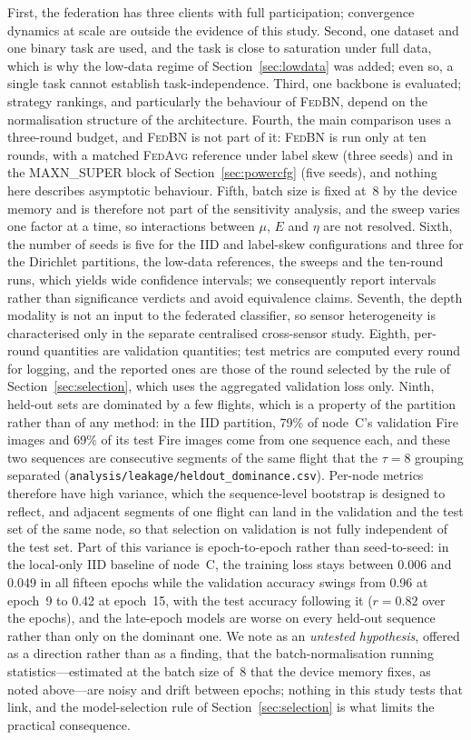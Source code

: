 \documentclass[journal]{IEEEtran}
\newcommand{\fedavg}{\textsc{FedAvg}}
\newcommand{\fedbn}{\textsc{FedBN}}
\begin{document}
First, the federation has three clients with full participation; convergence dynamics at scale are outside the evidence of this study. Second, one dataset and one binary task are used, and the task is close to saturation under full data, which is why the low-data regime of Section~\ref{sec:lowdata} was added; even so, a single task cannot establish task-independence. Third, one backbone is evaluated; strategy rankings, and particularly the behaviour of \fedbn{}, depend on the normalisation structure of the architecture. Fourth, the main comparison uses a three-round budget, and \fedbn{} is not part of it: \fedbn{} is run only at ten rounds, with a matched \fedavg{} reference under label skew (three seeds) and in the MAXN\_SUPER block of Section~\ref{sec:powercfg} (five seeds), and nothing here describes asymptotic behaviour. Fifth, batch size is fixed at~8 by the device memory and is therefore not part of the sensitivity analysis, and the sweep varies one factor at a time, so interactions between $\mu$, $E$ and $\eta$ are not resolved. Sixth, the number of seeds is five for the IID and label-skew configurations and three for the Dirichlet partitions, the low-data references, the sweeps and the ten-round runs, which yields wide confidence intervals; we consequently report intervals rather than significance verdicts and avoid equivalence claims. Seventh, the depth modality is not an input to the federated classifier, so sensor heterogeneity is characterised only in the separate centralised cross-sensor study. Eighth, per-round quantities are validation quantities; test metrics are computed every round for logging, and the reported ones are those of the round selected by the rule of Section~\ref{sec:selection}, which uses the aggregated validation loss only. Ninth, held-out sets are dominated by a few flights, which is a property of the partition rather than of any method: in the IID partition, 79\% of node~C's validation Fire images and 69\% of its test Fire images come from one sequence each, and these two sequences are consecutive segments of the same flight that the $\tau=8$ grouping separated (\texttt{analysis/leakage/heldout\_dominance.csv}). Per-node metrics therefore have high variance, which the sequence-level bootstrap is designed to reflect, and adjacent segments of one flight can land in the validation and the test set of the same node, so that selection on validation is not fully independent of the test set. Part of this variance is epoch-to-epoch rather than seed-to-seed: in the local-only IID baseline of node~C, the training loss stays between 0.006 and 0.049 in all fifteen epochs while the validation accuracy swings from 0.96 at epoch~9 to 0.42 at epoch~15, with the test accuracy following it ($r = 0.82$ over the epochs), and the late-epoch models are worse on every held-out sequence rather than only on the dominant one. We note as an \emph{untested hypothesis}, offered as a direction rather than as a finding, that the batch-normalisation running statistics---estimated at the batch size of~8 that the device memory fixes, as noted above---are noisy and drift between epochs; nothing in this study tests that link, and the model-selection rule of Section~\ref{sec:selection} is what limits the practical consequence.
\end{document}
